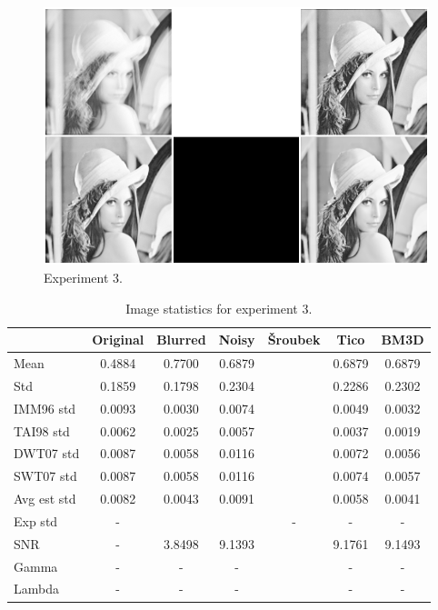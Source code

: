 \documentclass[12pt,notitlepage]{report}
\begin{document}
\begin{figure}[htb]
 \begin{center}
  \includegraphics[width=12cm]{experiment_003_complete.png}
 \end{center}
 \caption{Experiment 3.}
 \label{fig:experiment_003_complete}
\end{figure}

\begin{table}
  \begin{center}
  \begin{tabular}{ | l | c | c | c | c | c | c | }
	\hline
		& Original & Blurred & Noisy & Šroubek & Tico & BM3D \\ \hline 
	Mean & 0.4884 & 0.7700 & 0.6879 &  & 0.6879 & 0.6879 \\ \hline 
	Std & 0.1859 & 0.1798 & 0.2304 &  & 0.2286 & 0.2302 \\ \hline 
	IMM96 std & 0.0093 & 0.0030 & 0.0074 &  & 0.0049 & 0.0032 \\ \hline 
	TAI98 std  & 0.0062 & 0.0025 & 0.0057 &  & 0.0037 & 0.0019 \\ \hline 
	DWT07 std  & 0.0087 & 0.0058 & 0.0116 &  & 0.0072 & 0.0056 \\ \hline 
	SWT07 std & 0.0087 & 0.0058 & 0.0116 &  & 0.0074 & 0.0057 \\ \hline 
	Avg est std & 0.0082 & 0.0043 & 0.0091 &  & 0.0058 & 0.0041 \\ \hline 
	Exp std & - &  &  & - & - & - \\ \hline 
	SNR     & - & 3.8498 & 9.1393 &  & 9.1761 & 9.1493 \\ \hline 
	Gamma & - & - & - &  & - & - \\ \hline 
	Lambda & - & - & - &  & - & - \\ \hline 

  \end{tabular}
  \end{center}
  \caption{Image statistics for experiment 3.}
  \label{tab:experiment_003_statistics}
\end{table}
\end{document}
